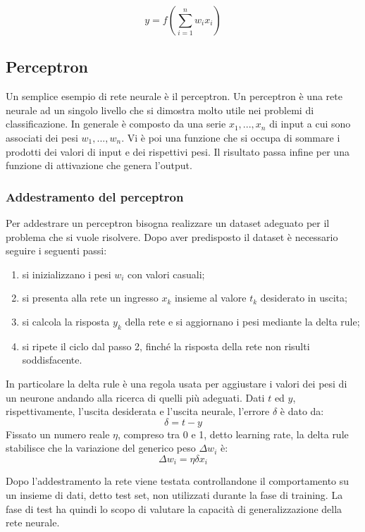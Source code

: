 \documentclass[a4paper,11pt]{article}
\begin{document}
    $$y = f(\sum_{i=1}^{n}w_i x_i)$$

    \subsection{Perceptron}
    Un semplice esempio di rete neurale è il perceptron. Un perceptron è una rete neurale ad un singolo livello che si dimostra molto utile nei problemi di classificazione.
    In generale è composto da una serie $x_1, ..., x_n$ di input a cui sono associati dei pesi $w_1, ..., w_n$. 
    Vi è poi una funzione che si occupa di sommare i prodotti dei valori di input e dei rispettivi pesi. 
    Il risultato passa infine per una funzione di attivazione che genera l'output.

    \newpage
    \subsubsection{Addestramento del perceptron}
    Per addestrare un perceptron bisogna realizzare un dataset adeguato per il problema che si vuole risolvere. 
    Dopo aver predisposto il dataset è necessario seguire i seguenti passi:
    \begin{enumerate}
        \item si inizializzano i pesi $w_i$ con valori casuali;
        \item si presenta alla rete un ingresso $x_k$ insieme al valore $t_k$ desiderato in uscita;
        \item si calcola la risposta $y_k$ della rete e si aggiornano i pesi mediante la delta rule;
        \item si ripete il ciclo dal passo 2, finché la risposta della rete non risulti soddisfacente.
    \end{enumerate}

    In particolare la delta rule è una regola usata per aggiustare i valori dei pesi di un neurone andando alla ricerca di quelli più adeguati.
    Dati $t$ ed $y$, rispettivamente, l'uscita desiderata e l'uscita neurale, l'errore $\delta$ è dato da:
    $$ \delta = t-y $$
    Fissato un numero reale $\eta$, compreso tra 0 e 1, detto learning rate, la delta rule stabilisce che la variazione del generico peso $\Delta w_i$ è:
    $$ \Delta w_i = \eta \delta x_i $$

    Dopo l’addestramento la rete viene testata controllandone il comportamento su un insieme di dati, detto test set, non utilizzati durante la fase di training. La fase di test ha quindi lo scopo 
    di valutare la capacità di generalizzazione della rete neurale.
\end{document}
